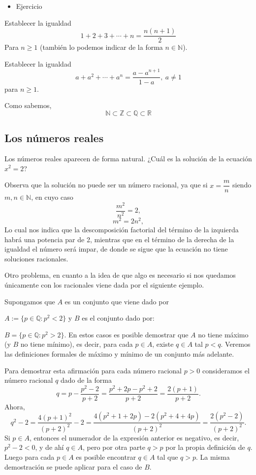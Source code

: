 \documentclass[12pt]{article}
\begin{document}
\begin{itemize}[label=\color{red}\textbullet, leftmargin=*]
	\item \color{lightblue} Ejercicio
\end{itemize}
Establecer la igualdad \[ 1+2+3+\cdots+n=\dfrac{n(n+1)}{2} \]
Para $n\ge 1$ (también lo podemos indicar de la forma $n\in\mathbb{N}$).

Establecer la igualdad \[ a+a^2+\cdots+a^n=\dfrac{a-a^{n+1}}{1-a},~a\neq1 \] para $n\ge1$.

Como sabemos, \[ \mathbb{N}\subset\mathbb{Z}\subset\mathbb{Q}\subset\mathbb{R} \]
\subsection{Los números reales}
Los números reales aparecen de forma natural. ¿Cuál es la solución de la ecuación $x^2=2$?

Observa que la solución no puede ser un número racional, ya que si $x=\dfrac{m}{n}$ siendo $m,n\in\mathbb{N}$, en cuyo caso \[ \dfrac{m^2}{n^2}=2, \]\[ m^2=2n^2, \]
Lo cual nos indica que la descomposición factorial del término de la izquierda habrá una potencia par de 2, mientras que en el término de la derecha de la igualdad el número será impar, de donde se sigue que la ecuación no tiene soluciones racionales.

Otro problema, en cuanto a la idea de que algo es necesario si nos quedamos únicamente con los racionales viene dada por el siguiente ejemplo.

Supongamos que $A$ es un conjunto que viene dado por

$A:=\{p\in\mathbb{Q}:p^2<2\}$ y $B$ es el conjunto dado por:

$B=\{p\in\mathbb{Q}:p^2>2\}$. En estos casos es posible demostrar que $A$ no tiene máximo (y $B$ no tiene mínimo), es decir, para cada $p\in A$, existe $q\in A$ tal $p<q$. Veremos las definiciones formales de máximo y mínimo de un conjunto más adelante.

Para demostrar esta afirmación para cada número racional $p>0$ consideramos el número racional $q$ dado de la forma \[ q=p-\dfrac{p^2-2}{p+2}=\dfrac{p^2+2p-p^2+2}{p+2}=\dfrac{2(p+1)}{p+2}. \]
Ahora, \[ q^2-2=\dfrac{4(p+1)^2}{(p+2)^2}-2=\dfrac{4(p^2+1+2p)-2(p^2+4+4p)}{(p+2)^2}=\dfrac{2(p^2-2)}{(p+2)^2}.\]
Si $p\in A$, entonces el numerador de la expresión anterior es negativo, es decir, $p^2-2<0$, y de ahí $q\in A$, pero por otra parte $q>p$ por la propia definición de $q$. Luego para cada $p\in A$ es posible encontrar $q\in A$ tal que $q>p$. La misma demostración se puede aplicar para el caso de $B$.
\end{document}
